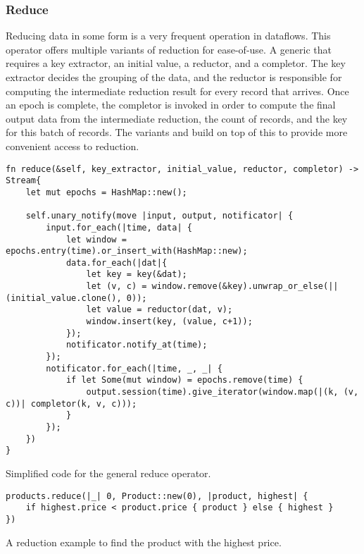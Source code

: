 \subsubsection{Reduce}
Reducing data in some form is a very frequent operation in dataflows. This operator offers multiple variants of reduction for ease-of-use. A generic  that requires a key extractor, an initial value, a reductor, and a completor. The key extractor decides the grouping of the data, and the reductor is responsible for computing the intermediate reduction result for every record that arrives. Once an epoch is complete, the completor is invoked in order to compute the final output data from the intermediate reduction, the count of records, and the key for this batch of records. The variants  and  build on top of this to provide more convenient access to reduction.

\begin{listing}[H]
\begin{verbatim}
fn reduce(&self, key_extractor, initial_value, reductor, completor) -> Stream{
    let mut epochs = HashMap::new();

    self.unary_notify(move |input, output, notificator| {
        input.for_each(|time, data| {
            let window = epochs.entry(time).or_insert_with(HashMap::new);
            data.for_each(|dat|{
                let key = key(&dat);
                let (v, c) = window.remove(&key).unwrap_or_else(|| (initial_value.clone(), 0));
                let value = reductor(dat, v);
                window.insert(key, (value, c+1));
            });
            notificator.notify_at(time);
        });
        notificator.for_each(|time, _, _| {
            if let Some(mut window) = epochs.remove(time) {
                output.session(time).give_iterator(window.map(|(k, (v, c))| completor(k, v, c)));
            }
        });
    })
}
\end{verbatim}
  \caption{Simplified code for the general reduce operator.}
  \label{lst:reduce}
\end{listing}

\begin{listing}[H]
\begin{verbatim}
products.reduce(|_| 0, Product::new(0), |product, highest| {
    if highest.price < product.price { product } else { highest }
})
\end{verbatim}
\caption{A reduction example to find the product with the highest price.}
\label{lst:reduce-example}
\end{listing}

